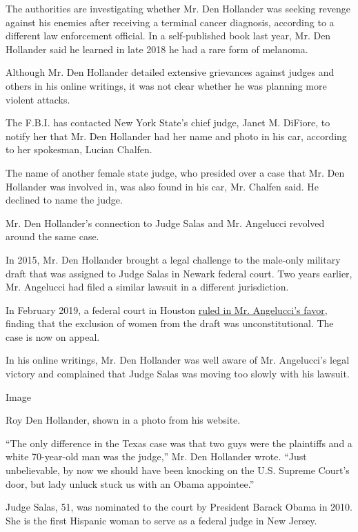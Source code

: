 The authorities are investigating whether Mr. Den Hollander was seeking
revenge against his enemies after receiving a terminal cancer diagnosis,
according to a different law enforcement official. In a self-published
book last year, Mr. Den Hollander said he learned in late 2018 he had a
rare form of melanoma.

Although Mr. Den Hollander detailed extensive grievances against judges
and others in his online writings, it was not clear whether he was
planning more violent attacks.

The F.B.I. has contacted New York State's chief judge, Janet M. DiFiore,
to notify her that Mr. Den Hollander had her name and photo in his car,
according to her spokesman, Lucian Chalfen.

The name of another female state judge, who presided over a case that
Mr. Den Hollander was involved in, was also found in his car, Mr.
Chalfen said. He declined to name the judge.

Mr. Den Hollander's connection to Judge Salas and Mr. Angelucci revolved
around the same case.

In 2015, Mr. Den Hollander brought a legal challenge to the male-only
military draft that was assigned to Judge Salas in Newark federal court.
Two years earlier, Mr. Angelucci had filed a similar lawsuit in a
different jurisdiction.

In February 2019, a federal court in Houston
\href{https://www.nytimes.com/2019/02/24/us/military-draft-men-unconstitutional.html}{ruled
in Mr. Angelucci's favor}, finding that the exclusion of women from the
draft was unconstitutional. The case is now on appeal.

In his online writings, Mr. Den Hollander was well aware of Mr.
Angelucci's legal victory and complained that Judge Salas was moving too
slowly with his lawsuit.

Image

Roy Den Hollander, shown in a photo from his website.

``The only difference in the Texas case was that two guys were the
plaintiffs and a white 70-year-old man was the judge,'' Mr. Den
Hollander wrote. ``Just unbelievable, by now we should have been
knocking on the U.S. Supreme Court's door, but lady unluck stuck us with
an Obama appointee.''

Judge Salas, 51, was nominated to the court by President Barack Obama in
2010. She is the first Hispanic woman to serve as a federal judge in New
Jersey.

